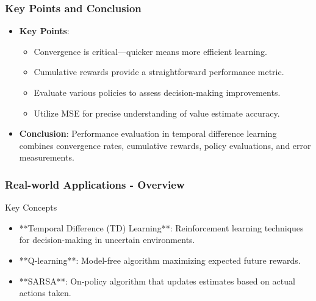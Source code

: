 \documentclass[aspectratio=169]{beamer}
\begin{document}
\begin{frame}[fragile]
    \frametitle{Key Points and Conclusion}
    \begin{itemize}
        \item \textbf{Key Points}:
        \begin{itemize}
            \item Convergence is critical—quicker means more efficient learning.
            \item Cumulative rewards provide a straightforward performance metric.
            \item Evaluate various policies to assess decision-making improvements.
            \item Utilize MSE for precise understanding of value estimate accuracy.
        \end{itemize}
        \item \textbf{Conclusion}: Performance evaluation in temporal difference learning combines convergence rates, cumulative rewards, policy evaluations, and error measurements.
    \end{itemize}
\end{frame}

\begin{frame}
    \frametitle{Real-world Applications - Overview}
    \begin{block}{Key Concepts}
        \begin{itemize}
            \item **Temporal Difference (TD) Learning**: Reinforcement learning techniques for decision-making in uncertain environments.
            \item **Q-learning**: Model-free algorithm maximizing expected future rewards.
            \item **SARSA**: On-policy algorithm that updates estimates based on actual actions taken.
        \end{itemize}
    \end{block}
\end{frame}
\end{document}
